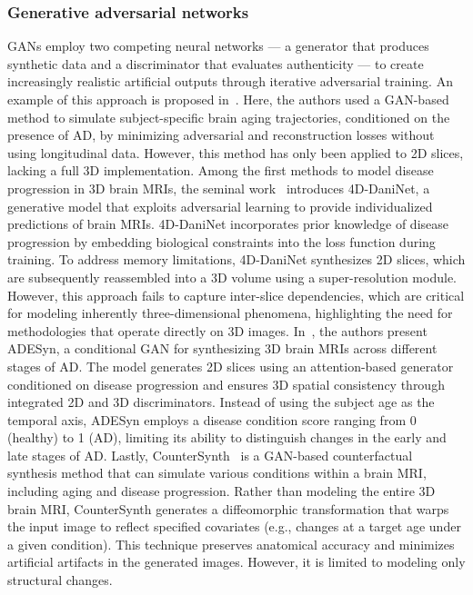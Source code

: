 \subsubsection{Generative adversarial networks}
GANs employ two competing neural networks — a generator that produces synthetic data and a discriminator that evaluates authenticity — to create increasingly realistic artificial outputs through iterative adversarial training. An example of this approach is proposed in~\citep{xia2021learning}. Here, the authors used a GAN-based method to simulate subject-specific brain aging trajectories, conditioned on the presence of AD, by minimizing adversarial and reconstruction losses without using longitudinal data. However, this method has only been applied to 2D slices, lacking a full 3D implementation. Among the first methods to model disease progression in 3D brain MRIs, the seminal work~\citep{ravi2022degenerative} introduces 4D-DaniNet, a generative model that exploits adversarial learning to provide individualized predictions of brain MRIs. 4D-DaniNet incorporates prior knowledge of disease progression by embedding biological constraints into the loss function during training. To address memory limitations, 4D-DaniNet synthesizes 2D slices, which are subsequently reassembled into a 3D volume using a super-resolution module. However, this approach fails to capture inter-slice dependencies, which are critical for modeling inherently three-dimensional phenomena, highlighting the need for methodologies that operate directly on 3D images. In~\citep{jung2021conditional}, the authors present ADESyn, a conditional GAN for synthesizing 3D brain MRIs across different stages of AD. The model generates 2D slices using an attention-based generator conditioned on disease progression and ensures 3D spatial consistency through integrated 2D and 3D discriminators. Instead of using the subject age as the temporal axis, ADESyn employs a disease condition score ranging from 0 (healthy) to 1 (AD), limiting its ability to distinguish changes in the early and late stages of AD. Lastly, CounterSynth~\citep{pombo2023equitable} is a GAN-based counterfactual synthesis method that can simulate various conditions within a brain MRI, including aging and disease progression. Rather than modeling the entire 3D brain MRI, CounterSynth generates a diffeomorphic transformation that warps the input image to reflect specified covariates (e.g., changes at a target age under a given condition). This technique preserves anatomical accuracy and minimizes artificial artifacts in the generated images. However, it is limited to modeling only structural changes.

